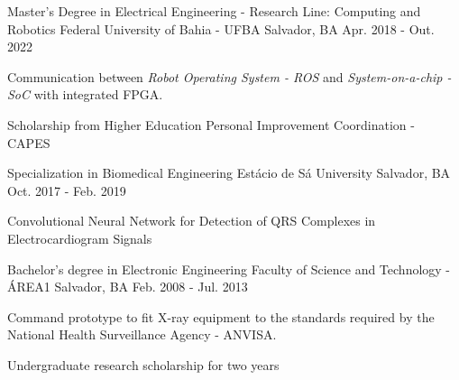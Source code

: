 

\begin{cventries}
  

  \cventry
    {Master's Degree in Electrical Engineering - Research Line: Computing and Robotics} %
    {Federal University of Bahia - UFBA} %
    {Salvador, BA} %
    {Apr. 2018 - Out. 2022} %
    {
      \begin{cvitems} %
        \item {Communication between \textit{Robot Operating System - ROS} and \textit{System-on-a-chip - SoC} with integrated FPGA.}
        \item {Scholarship from Higher Education Personal Improvement Coordination - CAPES }
      \end{cvitems}
    }


  \cventry
    {Specialization in Biomedical Engineering} %
    {Estácio de Sá University} %
    {Salvador, BA} %
    {Oct. 2017 - Feb. 2019} %
    {
      \begin{cvitems} %
        \item {Convolutional Neural Network for Detection of QRS Complexes in Electrocardiogram Signals}
      \end{cvitems}
    }


  \cventry
    {Bachelor's degree in Electronic Engineering} %
    {Faculty of Science and Technology - ÁREA1} %
    {Salvador, BA} %
    {Feb. 2008 - Jul. 2013} %
    {
      \begin{cvitems} %
        \item {Command prototype to fit X-ray equipment to the standards required by the National Health Surveillance Agency - ANVISA.}
        \item {Undergraduate research scholarship for two years}
      \end{cvitems}
    }


\end{cventries}
